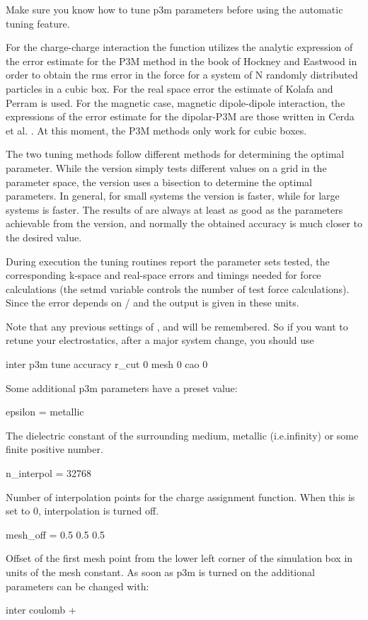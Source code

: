 Make sure you know how to tune p3m parameters before using the
automatic tuning feature.

For the charge-charge interaction the function utilizes the analytic
expression of the error estimate for the P3M method in the book of
Hockney and Eastwood \cite[eqn 8.23]{hockney88} in order to obtain the
rms error in the force for a system of N randomly distributed
particles in a cubic box.  For the real space error the estimate of
Kolafa and Perram \cite{kolafa92} is used. For the magnetic case,
magnetic dipole-dipole interaction, the expressions of the error
estimate for the dipolar-P3M are those written in Cerda et
al. \cite{cerda08a}. At this moment, the P3M methods only work for
cubic boxes.

The two tuning methods follow different methods for determining the
optimal parameter. While the  version simply tests
different values on a grid in the parameter space, the
 version uses a bisection to determine the optimal
parameters. In general, for small systems the  version
is faster, while for large systems  is faster. The
results of  are always at least as good as the
parameters achievable from the  version, and normally
the obtained accuracy is much closer to the desired value.

During execution the tuning routines report the parameter sets tested,
the corresponding k-space and real-space errors and timings needed for
force calculations (the setmd variable  controls the
number of test force calculations). Since the error depends on
/ and \var{\alpha} the
output is given in these units.

Note that any previous settings of ,  and
 will be remembered. So if you want to retune your
electrostatics, \eg after a major system change, you should use
\begin{code}
inter    p3m tune accuracy  r_cut 0 mesh 0 cao 0
\end{code}

\noindent Some additional p3m parameters have a preset value:
\begin{tclcode}
 epsilon = metallic
\end{tclcode}
The dielectric constant of the surrounding medium, metallic
(i.e.infinity) or some finite positive number.
\begin{tclcode}
 n_interpol = 32768
\end{tclcode}
Number of interpolation points for the charge assignment function.
When this is set to 0, interpolation is turned off.
\begin{tclcode}
 mesh_off = 0.5 0.5 0.5
\end{tclcode}
Offset of the first mesh point from the lower left corner of the
simulation box in units of the mesh constant. As soon as p3m is turned
on the additional parameters can be changed with:
\begin{code}
inter coulomb  +
\end{code}

